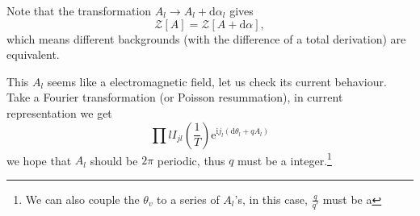 Note that the transformation $A_{l} \to A_{l} + \mathrm{d} \alpha _{l}$ gives
\begin{equation}
  \mathcal{Z}[A] = \mathcal{Z}[A + \mathrm{d} \alpha],
\end{equation}
which means different backgrounds (with the difference of a total derivation) are equivalent.

This $A_l$ seems like a electromagnetic field, let us check its current behaviour. Take a Fourier transformation (or Poisson resummation), in current representation we get
\begin{equation}
  \prod{l} I_{j l} \left( \frac{1}{T} \right) \mathrm{e}^{\mathrm{i} j_{l} \left( \mathrm{d} \theta_{l} + q A_l \right)}
\end{equation}
we hope that $A_l$ should be $2 \pi $ periodic, thus $q$ must be a integer.\footnote{We can also couple the $\theta _{v}$ to a series of $A_l$'s, in this case, $\frac{q}{q'}$ must be a }
